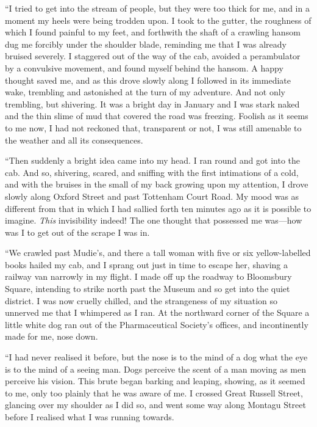 “I tried to get into the stream of people, but they were too thick for me, and in a moment my heels were being trodden upon. I took to the gutter, the roughness of which I found painful to my feet, and forthwith the shaft of a crawling hansom dug me forcibly under the shoulder blade, reminding me that I was already bruised severely. I staggered out of the way of the cab, avoided a perambulator by a convulsive movement, and found myself behind the hansom. A happy thought saved me, and as this drove slowly along I followed in its immediate wake, trembling and astonished at the turn of my adventure. And not only trembling, but shivering. It was a bright day in January and I was stark naked and the thin slime of mud that covered the road was freezing. Foolish as it seems to me now, I had not reckoned that, transparent or not, I was still amenable to the weather and all its consequences.

“Then suddenly a bright idea came into my head. I ran round and got into the cab. And so, shivering, scared, and sniffing with the first intimations of a cold, and with the bruises in the small of my back growing upon my attention, I drove slowly along Oxford Street and past Tottenham Court Road. My mood was as different from that in which I had sallied forth ten minutes ago as it is possible to imagine. \emph{This} invisibility indeed! The one thought that possessed me was—how was I to get out of the scrape I was in.

“We crawled past Mudie’s, and there a tall woman with five or six yellow-labelled books hailed my cab, and I sprang out just in time to escape her, shaving a railway van narrowly in my flight. I made off up the roadway to Bloomsbury Square, intending to strike north past the Museum and so get into the quiet district. I was now cruelly chilled, and the strangeness of my situation so unnerved me that I whimpered as I ran. At the northward corner of the Square a little white dog ran out of the Pharmaceutical Society’s offices, and incontinently made for me, nose down.

“I had never realised it before, but the nose is to the mind of a dog what the eye is to the mind of a seeing man. Dogs perceive the scent of a man moving as men perceive his vision. This brute began barking and leaping, showing, as it seemed to me, only too plainly that he was aware of me. I crossed Great Russell Street, glancing over my shoulder as I did so, and went some way along Montagu Street before I realised what I was running towards.

